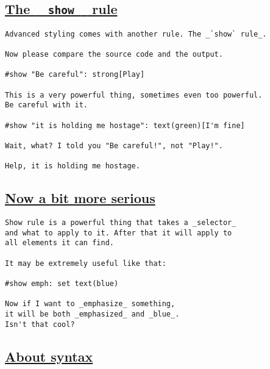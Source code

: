 \subsection{\texorpdfstring{\hyperref[the-show-rule]{The
\texttt{\ }{\texttt{\ show\ }}\texttt{\ }
rule}}{The   show   rule}}\label{the-show-rule}

\begin{verbatim}
Advanced styling comes with another rule. The _`show` rule_.

Now please compare the source code and the output.

#show "Be careful": strong[Play]

This is a very powerful thing, sometimes even too powerful.
Be careful with it.

#show "it is holding me hostage": text(green)[I'm fine]

Wait, what? I told you "Be careful!", not "Play!".

Help, it is holding me hostage.
\end{verbatim}

\pandocbounded{}

\subsection{\texorpdfstring{\hyperref[now-a-bit-more-serious]{Now a bit
more serious}}{Now a bit more serious}}\label{now-a-bit-more-serious}

\begin{verbatim}
Show rule is a powerful thing that takes a _selector_
and what to apply to it. After that it will apply to
all elements it can find.

It may be extremely useful like that:

#show emph: set text(blue)

Now if I want to _emphasize_ something,
it will be both _emphasized_ and _blue_.
Isn't that cool?
\end{verbatim}

\pandocbounded{}

\subsection{\texorpdfstring{\hyperref[about-syntax]{About
syntax}}{About syntax}}\label{about-syntax}

